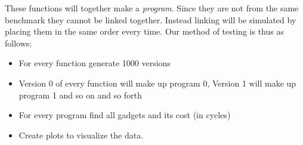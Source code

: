 These functions will together make a \textit{program}. Since they are not from the same
benchmark they cannot be linked together. Instead linking will be simulated by placing
them in the same order every time. Our method of testing is thus as follows:

\begin{itemize}
	\item For every function generate 1000 versions
	\item Version 0 of every function will make up program 0, Version 1 will make up program
		1 and so on and so forth
	\item For every program find all gadgets and its cost (in cycles)
	\item Create plots to visualize the data.

\end{itemize}

